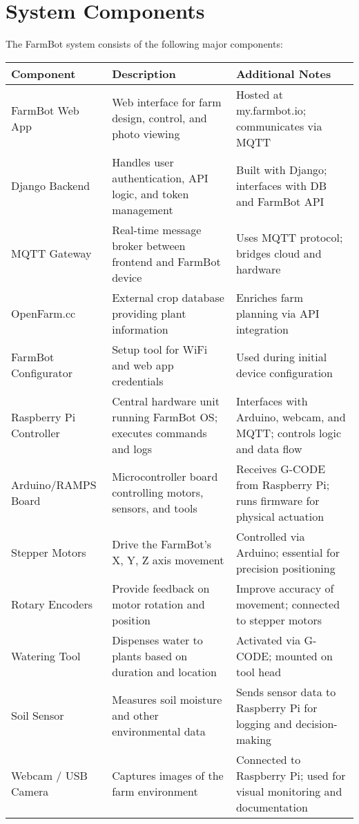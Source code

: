 \section{System Components}

The FarmBot system consists of the following major components:

\begin{longtable}{|p{}|p{}|p{}|}
\hline
\textbf{Component} & \textbf{Description} & \textbf{Additional Notes} \\
\hline
\endhead
FarmBot Web App & Web interface for farm design, control, and photo viewing & Hosted at my.farmbot.io; communicates via MQTT \\
\hline
Django Backend & Handles user authentication, API logic, and token management & Built with Django; interfaces with DB and FarmBot API \\
\hline
MQTT Gateway & Real-time message broker between frontend and FarmBot device & Uses MQTT protocol; bridges cloud and hardware \\
\hline
OpenFarm.cc & External crop database providing plant information & Enriches farm planning via API integration \\
\hline
FarmBot Configurator & Setup tool for WiFi and web app credentials & Used during initial device configuration \\
\hline
Raspberry Pi Controller & Central hardware unit running FarmBot OS; executes commands and logs & Interfaces with Arduino, webcam, and MQTT; controls logic and data flow \\
\hline
Arduino/RAMPS Board & Microcontroller board controlling motors, sensors, and tools & Receives G-CODE from Raspberry Pi; runs firmware for physical actuation \\
\hline
Stepper Motors & Drive the FarmBot's X, Y, Z axis movement & Controlled via Arduino; essential for precision positioning \\
\hline
Rotary Encoders & Provide feedback on motor rotation and position & Improve accuracy of movement; connected to stepper motors \\
\hline
Watering Tool & Dispenses water to plants based on duration and location & Activated via G-CODE; mounted on tool head \\
\hline
Soil Sensor & Measures soil moisture and other environmental data & Sends sensor data to Raspberry Pi for logging and decision-making \\
\hline
Webcam / USB Camera & Captures images of the farm environment & Connected to Raspberry Pi; used for visual monitoring and documentation \\

\end{longtable}
